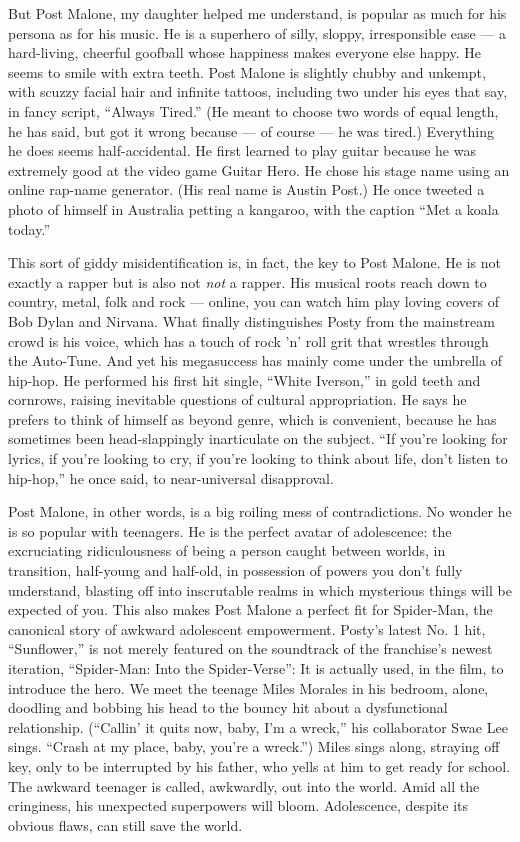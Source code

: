 But Post Malone, my daughter helped me understand, is popular as much
for his persona as for his music. He is a superhero of silly, sloppy,
irresponsible ease --- a hard-living, cheerful goofball whose happiness
makes everyone else happy. He seems to smile with extra teeth. Post
Malone is slightly chubby and unkempt, with scuzzy facial hair and
infinite tattoos, including two under his eyes that say, in fancy
script, ``Always Tired.'' (He meant to choose two words of equal length,
he has said, but got it wrong because --- of course --- he was tired.)
Everything he does seems half-accidental. He first learned to play
guitar because he was extremely good at the video game Guitar Hero. He
chose his stage name using an online rap-name generator. (His real name
is Austin Post.) He once tweeted a photo of himself in Australia petting
a kangaroo, with the caption ``Met a koala today.''

This sort of giddy misidentification is, in fact, the key to Post
Malone. He is not exactly a rapper but is also not \emph{not} a rapper.
His musical roots reach down to country, metal, folk and rock ---
online, you can watch him play loving covers of Bob Dylan and Nirvana.
What finally distinguishes Posty from the mainstream crowd is his voice,
which has a touch of rock 'n' roll grit that wrestles through the
Auto-Tune. And yet his megasuccess has mainly come under the umbrella of
hip-hop. He performed his first hit single, ``White Iverson,'' in gold
teeth and cornrows, raising inevitable questions of cultural
appropriation. He says he prefers to think of himself as beyond genre,
which is convenient, because he has sometimes been head-slappingly
inarticulate on the subject. ``If you're looking for lyrics, if you're
looking to cry, if you're looking to think about life, don't listen to
hip-hop,'' he once said, to near-universal disapproval.

Post Malone, in other words, is a big roiling mess of contradictions. No
wonder he is so popular with teenagers. He is the perfect avatar of
adolescence: the excruciating ridiculousness of being a person caught
between worlds, in transition, half-young and half-old, in possession of
powers you don't fully understand, blasting off into inscrutable realms
in which mysterious things will be expected of you. This also makes Post
Malone a perfect fit for Spider-Man, the canonical story of awkward
adolescent empowerment. Posty's latest No. 1 hit, ``Sunflower,'' is not
merely featured on the soundtrack of the franchise's newest iteration,
``Spider-Man: Into the Spider-Verse'': It is actually used, in the film,
to introduce the hero. We meet the teenage Miles Morales in his bedroom,
alone, doodling and bobbing his head to the bouncy hit about a
dysfunctional relationship. (``Callin' it quits now, baby, I'm a
wreck,'' his collaborator Swae Lee sings. ``Crash at my place, baby,
you're a wreck.'') Miles sings along, straying off key, only to be
interrupted by his father, who yells at him to get ready for school. The
awkward teenager is called, awkwardly, out into the world. Amid all the
cringiness, his unexpected superpowers will bloom. Adolescence, despite
its obvious flaws, can still save the world.

